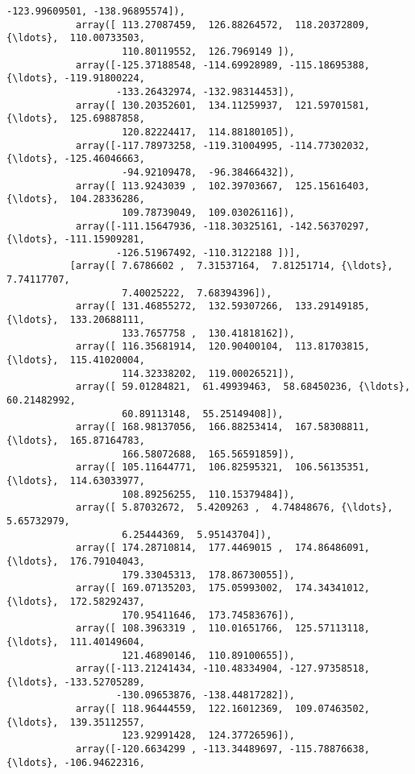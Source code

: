 \documentclass[11pt]{article}
\begin{document}
\begin{Verbatim}[commandchars=\\\{\}]
                   -123.99609501, -138.96895574]),
            array([ 113.27087459,  126.88264572,  118.20372809, {\ldots},  110.00733503,
                    110.80119552,  126.7969149 ]),
            array([-125.37188548, -114.69928989, -115.18695388, {\ldots}, -119.91800224,
                   -133.26432974, -132.98314453]),
            array([ 130.20352601,  134.11259937,  121.59701581, {\ldots},  125.69887858,
                    120.82224417,  114.88180105]),
            array([-117.78973258, -119.31004995, -114.77302032, {\ldots}, -125.46046663,
                    -94.92109478,  -96.38466432]),
            array([ 113.9243039 ,  102.39703667,  125.15616403, {\ldots},  104.28336286,
                    109.78739049,  109.03026116]),
            array([-111.15647936, -118.30325161, -142.56370297, {\ldots}, -111.15909281,
                   -126.51967492, -110.3122188 ])],
           [array([ 7.6786602 ,  7.31537164,  7.81251714, {\ldots},  7.74117707,
                    7.40025222,  7.68394396]),
            array([ 131.46855272,  132.59307266,  133.29149185, {\ldots},  133.20688111,
                    133.7657758 ,  130.41818162]),
            array([ 116.35681914,  120.90400104,  113.81703815, {\ldots},  115.41020004,
                    114.32338202,  119.00026521]),
            array([ 59.01284821,  61.49939463,  58.68450236, {\ldots},  60.21482992,
                    60.89113148,  55.25149408]),
            array([ 168.98137056,  166.88253414,  167.58308811, {\ldots},  165.87164783,
                    166.58072688,  165.56591859]),
            array([ 105.11644771,  106.82595321,  106.56135351, {\ldots},  114.63033977,
                    108.89256255,  110.15379484]),
            array([ 5.87032672,  5.4209263 ,  4.74848676, {\ldots},  5.65732979,
                    6.25444369,  5.95143704]),
            array([ 174.28710814,  177.4469015 ,  174.86486091, {\ldots},  176.79104043,
                    179.33045313,  178.86730055]),
            array([ 169.07135203,  175.05993002,  174.34341012, {\ldots},  172.58292437,
                    170.95411646,  173.74583676]),
            array([ 108.3963319 ,  110.01651766,  125.57113118, {\ldots},  111.40149604,
                    121.46890146,  110.89100655]),
            array([-113.21241434, -110.48334904, -127.97358518, {\ldots}, -133.52705289,
                   -130.09653876, -138.44817282]),
            array([ 118.96444559,  122.16012369,  109.07463502, {\ldots},  139.35112557,
                    123.92991428,  124.37726596]),
            array([-120.6634299 , -113.34489697, -115.78876638, {\ldots}, -106.94622316,

\end{Verbatim}
\end{document}
